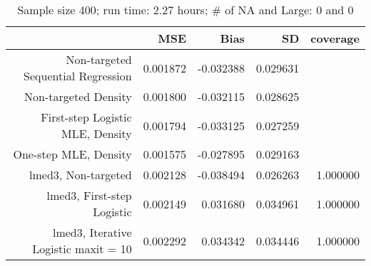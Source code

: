 \begin{table}[ht]
\centering
\caption{Sample size 400; run time: 2.27 hours; # of NA and Large:  0 and 0} 
\begin{tabular}{rrrrr}
  \hline
 & MSE & Bias & SD & coverage \\ 
  \hline
Non-targeted Sequential Regression & 0.001872 & -0.032388 & 0.029631 &  \\ 
  Non-targeted Density & 0.001800 & -0.032115 & 0.028625 &  \\ 
  First-step Logistic MLE, Density & 0.001794 & -0.033125 & 0.027259 &  \\ 
  One-step MLE, Density & 0.001575 & -0.027895 & 0.029163 &  \\ 
  lmed3, Non-targeted & 0.002128 & -0.038494 & 0.026263 & 1.000000 \\ 
  lmed3, First-step Logistic & 0.002149 & 0.031680 & 0.034961 & 1.000000 \\ 
  lmed3, Iterative Logistic maxit = 10 & 0.002292 & 0.034342 & 0.034446 & 1.000000 \\ 
   \hline
\end{tabular}
\end{table}
